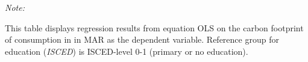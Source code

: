 \begin{table}[htbp!]
\begin{adjustbox}{width = 1\textwidth, max height = 0.95\textheight, center}
\begin{threeparttable}[b]
         \begin{tablenotes}\item \medskip \textit{Note:}
            \item This table displays regression results from equation OLS on the carbon footprint of consumption in  in MAR as the dependent variable.  Reference group for education (\textit{ISCED}) is ISCED-level 0-1 (primary or no education).
         \end{tablenotes}
      \end{threeparttable}
   \end{adjustbox}
\end{table}


